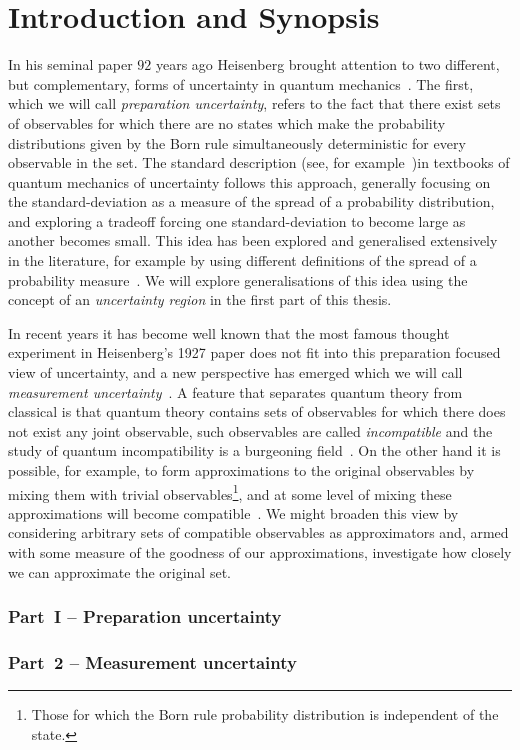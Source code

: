 \let\textcircled=\pgftextcircled
\chapter{Introduction and Synopsis}
\label{chap:intro}

In his seminal paper $92$ years ago Heisenberg brought attention to two different, but complementary, forms of uncertainty in quantum mechanics~\cite{Heisenberg1927-Wheeler+Zurek}. The first, which we will call \emph{preparation uncertainty}, refers to the fact that there exist sets of observables for which there are no states which make the probability distributions given by the Born rule simultaneously deterministic for every observable in the set. The standard description (see, for example~\cite{griffiths2005introduction})in textbooks of quantum mechanics of uncertainty follows this approach, generally focusing on the standard-deviation as a measure of the spread of a probability distribution, and exploring a tradeoff forcing one standard-deviation to become large as another becomes small. This idea has been explored and generalised extensively in the literature, for example by using different definitions of the spread of a probability measure~\cites{MaassenUffink1988}{doi:10.1063/1.3614503}{doi:10.1063/1.2759831}. We will explore generalisations of this idea using the concept of an \emph{uncertainty region} in the first part of this thesis.

In recent years it has become well known that the most famous thought experiment in Heisenberg's 1927 paper does not fit into this preparation focused view of uncertainty, and a new perspective has emerged which we will call \emph{measurement uncertainty}~\cites{PhysRevLett.111.160405}{blw-meas-uncertainty}{6773660Werner:2004:URJ:2011593.2011606}. A feature that separates quantum theory from classical is that quantum theory contains sets of observables for which there does not exist any joint observable, such observables are called \emph{incompatible} and the study of quantum incompatibility is a burgeoning field~\cites{Heinosaari_2016}{PhysRevLett.122.130402}{Heinosaari_2017}{PhysRevA.96.052127}. On the other hand it is possible, for example, to form approximations to the original observables by mixing them with trivial observables\footnote{Those for which the Born rule probability distribution is independent of the state.}, and at some level of mixing these approximations will become compatible~\cite{PhysRevA.87.052125}. We might broaden this view by considering arbitrary sets of compatible observables as approximators and, armed with some measure of the goodness of our approximations, investigate how closely we can approximate the original set.


\subsection*{Part~I -- Preparation uncertainty}



\subsection*{Part~2 -- Measurement uncertainty}

